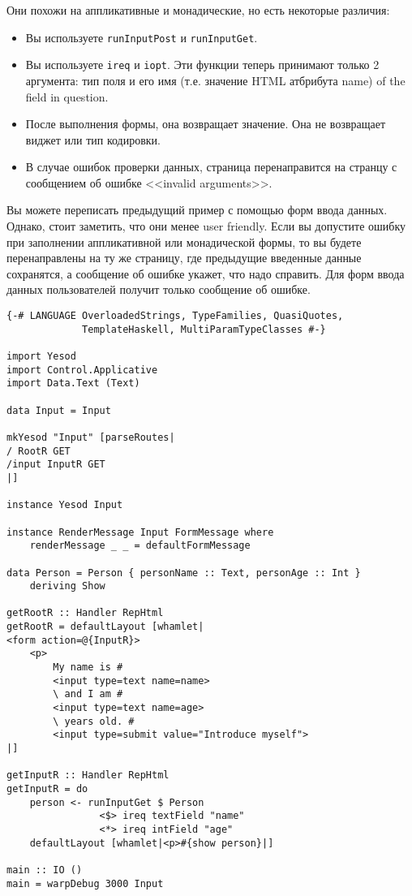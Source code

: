 Они похожи на аппликативные и монадические, но есть некоторые различия:
\begin{itemize}
 \item Вы используете \lstinline'runInputPost' и \lstinline'runInputGet'.
 \item Вы используете \lstinline'ireq' и \lstinline'iopt'. Эти функции теперь 
 принимают только 2 аргумента:
 тип поля и его имя (т.е. значение HTML атбрибута name) of the field in question.
 \item После выполнения формы, она возвращает значение. 
 Она не возвращает виджет или тип кодировки.
 \item В случае ошибок проверки данных, страница перенаправится на странцу 
 с сообщением об ошибке <<invalid arguments>>.
\end{itemize}
Вы можете переписать предыдущий пример с помощью форм ввода данных. Однако, стоит 
заметить, что они менее user friendly. Если вы допустите ошибку при заполнении 
аппликативной или монадической формы, то вы будете перенаправлены на ту же 
страницу, где предыдущие введенные данные сохранятся, а сообщение об ошибке 
укажет, что надо справить. Для форм ввода данных пользователей получит только 
сообщение об ошибке.

\begin{lstlisting}
{-# LANGUAGE OverloadedStrings, TypeFamilies, QuasiQuotes,
             TemplateHaskell, MultiParamTypeClasses #-}

import Yesod
import Control.Applicative
import Data.Text (Text)

data Input = Input

mkYesod "Input" [parseRoutes|
/ RootR GET
/input InputR GET
|]

instance Yesod Input

instance RenderMessage Input FormMessage where
    renderMessage _ _ = defaultFormMessage

data Person = Person { personName :: Text, personAge :: Int }
    deriving Show

getRootR :: Handler RepHtml
getRootR = defaultLayout [whamlet|
<form action=@{InputR}>
    <p>
        My name is #
        <input type=text name=name>
        \ and I am #
        <input type=text name=age>
        \ years old. #
        <input type=submit value="Introduce myself">
|]

getInputR :: Handler RepHtml
getInputR = do
    person <- runInputGet $ Person
                <$> ireq textField "name"
                <*> ireq intField "age"
    defaultLayout [whamlet|<p>#{show person}|]

main :: IO ()
main = warpDebug 3000 Input
\end{lstlisting}


